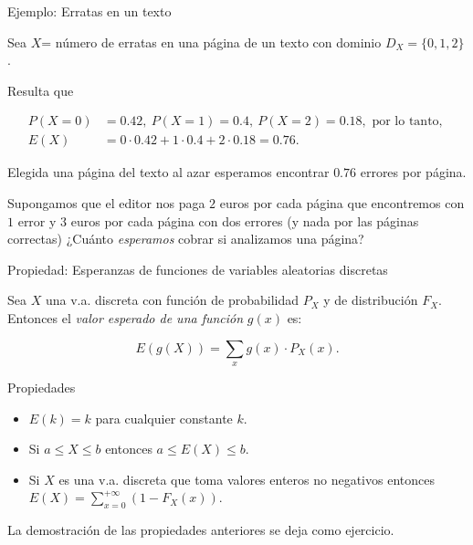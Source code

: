 \documentclass[
  letterpaper,
  DIV=11,
  numbers=noendperiod]{scrreprt}
\providecommand{\tightlist}{%
  \setlength{\itemsep}{0pt}\setlength{\parskip}{0pt}}\usepackage{longtable,booktabs,array}
\begin{document}
\begin{Ejemplo}{Ejemplo: Erratas en un texto}{}

Sea \(X\)= número de erratas en una página de un texto con dominio
\(D_X=\{0,1,2\}\).

Resulta que

\begin{align*}
P(X=0)&= 0.42,\ P(X=1)=0.4,\ P(X=2)=0.18, \mbox{ por lo tanto, }\\
E(X)&= 0\cdot 0.42+ 1\cdot 0.4 + 2 \cdot 0.18=0.76.
\end{align*}

Elegida una página del texto al azar esperamos encontrar \(0.76\)
errores por página.

Supongamos que el editor nos paga \(2\) euros por cada página que
encontremos con \(1\) error y \(3\) euros por cada página con dos
errores (y nada por las páginas correctas) ¿Cuánto \emph{esperamos}
cobrar si analizamos una página?

\end{Ejemplo}

\begin{Proposicion}{Propiedad: Esperanzas de funciones de variables aleatorias discretas}{}

Sea \(X\) una v.a. discreta con función de probabilidad \(P_{X}\) y de
distribución \(F_{X}\). Entonces el \emph{valor esperado de una función}
\(g(x)\) es:

\[E(g(X))=\sum_{x}g(x) \cdot  P_{X}(x).\]

\end{Proposicion}

\begin{Proposicion}{Propiedades}{}

\begin{itemize}
\tightlist
\item
  \(E(k)=k\) para cualquier constante \(k\).
\item
  Si \(a\leq X\leq b\) entonces \(a\leq E(X)\leq b\).
\item
  Si \(X\) es una v.a. discreta que toma valores enteros no negativos
  entonces \(E(X)=\sum_{x=0}^{+\infty}(1- F_X(x)).\)
\end{itemize}

\end{Proposicion}

La demostración de las propiedades anteriores se deja como ejercicio.
\end{document}
